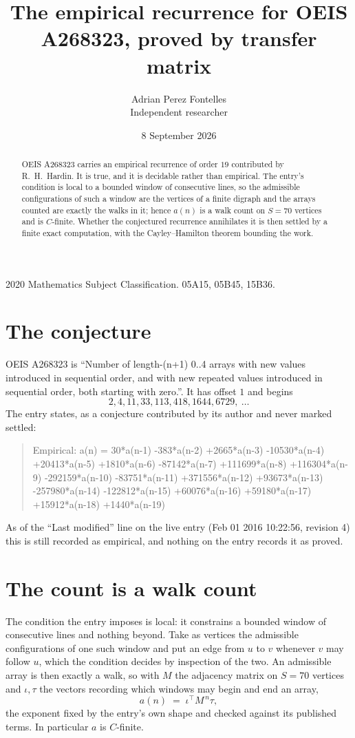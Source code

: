 \documentclass[11pt,a4paper]{article}
\title{The empirical recurrence for OEIS A268323, proved by transfer matrix}
\author{Adrian Perez Fontelles\\ \small Independent researcher}
\date{8 September 2026}
\theoremstyle{plain}
\theoremstyle{definition}
\begin{document}
\maketitle

\begin{abstract}
OEIS A268323 carries an empirical recurrence of order $19$ contributed by R.~H.~Hardin. It is
true, and it is decidable rather than empirical. The entry's condition is local to a bounded window of consecutive lines, so
the admissible configurations of such a window are the vertices of a finite digraph and the
arrays counted are exactly the walks in it; hence $a(n)$ is a walk count on $S=70$ vertices
and is $C$-finite. Whether the conjectured recurrence annihilates it is then settled by a
finite exact computation, with the Cayley--Hamilton theorem bounding the work.
\end{abstract}

\noindent\small 2020 Mathematics Subject Classification. 05A15, 05B45, 15B36.\normalsize

\section{The conjecture}

OEIS A268323 is ``Number of length-(n+1) 0..4 arrays with new values introduced in sequential order, and with new repeated values introduced in sequential order, both starting with zero.''. It has offset $1$ and begins
\[
2, 4, 11, 33, 113, 418, 1644, 6729,\ \dots
\]
The entry states, as a conjecture contributed by its author and never marked settled:
\begin{quote}
Empirical: a(n) = 30*a(n-1) -383*a(n-2) +2665*a(n-3) -10530*a(n-4) +20413*a(n-5) +1810*a(n-6) -87142*a(n-7) +111699*a(n-8) +116304*a(n-9) -292159*a(n-10) -83751*a(n-11) +371556*a(n-12) +93673*a(n-13) -257980*a(n-14) -122812*a(n-15) +60076*a(n-16) +59180*a(n-17) +15912*a(n-18) +1440*a(n-19)
\end{quote}
As of the ``Last modified'' line on the live entry (Feb 01 2016 10:22:56, revision 4) this is still
recorded as empirical, and nothing on the entry records it as proved.

\section{The count is a walk count}

The condition the entry imposes is local: it constrains a bounded window of consecutive lines and nothing beyond. Take as
vertices the admissible configurations of one such window and put an edge from $u$ to $v$
whenever $v$ may follow $u$, which the condition decides by inspection of the two. An
admissible array is then exactly a walk, so with $M$ the adjacency matrix on $S=70$ vertices
and $\iota,\tau$ the vectors recording which windows may begin and end an array,
\[
a(n)\;=\;\iota^{\!\top}M^{\,n}\tau ,
\]
the exponent fixed by the entry's own shape and checked against its published terms. In
particular $a$ is $C$-finite.
\end{document}
